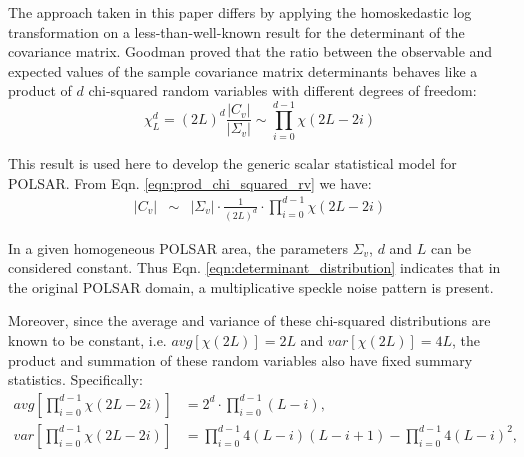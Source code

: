\documentclass[journal]{IEEEtran}
\begin{document}
The approach taken in this paper differs by applying the homoskedastic log transformation  on a less-than-well-known result for the determinant of the covariance matrix.
Goodman \cite{Goodman_1963_AMS_178} proved
that the ratio between the observable and expected values of the sample covariance matrix determinants
  behaves like a product of $d$ chi-squared random variables with different degrees of freedom: 
\begin{equation}
\chi^d_L = (2L)^d \frac{|C_v|}{|\Sigma_v|} \sim \prod_{i=0}^{d-1} \chi (2L-2i)
\label{eqn:prod_chi_squared_rv}  
\end{equation}

This result is used here to develop the generic scalar statistical model for POLSAR. %
From Eqn. \ref{eqn:prod_chi_squared_rv} %
we have: %
\begin{eqnarray}
  |C_v| &\sim& |\Sigma_v| \cdot \frac{1}{(2L)^d} \cdot \prod_{i=0}^{d-1} \chi (2L-2i) \label{eqn:determinant_distribution} %
\end{eqnarray}

In a given homogeneous POLSAR area, the parameters $\Sigma_v$, $d$ and $L$ can be considered constant.
Thus Eqn. \ref{eqn:determinant_distribution} indicates that 
  in the original POLSAR domain, a multiplicative speckle noise pattern is present.

Moreover, since the average and variance of these chi-squared distributions %
  are known to be constant, i.e. $avg \left[ \chi(2L) \right] = 2L$ and $var \left[ \chi(2L) \right] = 4L$,
  the product and summation of these random variables also have fixed summary statistics.
Specifically:
{\footnotesize
\begin{align*}
  avg \left[ \prod^{d-1}_{i=0} \chi(2L-2i) \right] &= 2^d \cdot \prod^{d-1}_{i=0} (L-i), \\
  var \left[ \prod^{d-1}_{i=0} \chi(2L-2i) \right] &= \prod^{d-1}_{i=0} 4(L-i)(L-i+1) - \prod^{d-1}_{i=0} 4(L-i)^2, %
\end{align*}
}
\end{document}

